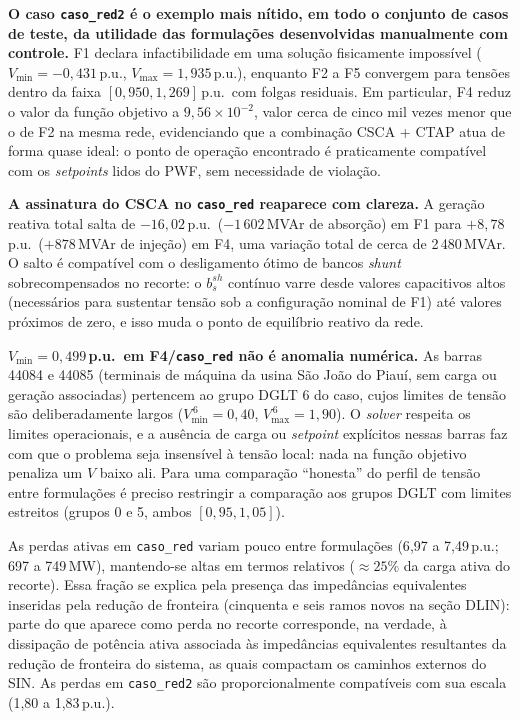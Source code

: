 \begin{alineascomnumero}
    \item \textbf{O caso \texttt{caso\_red2} é o exemplo mais nítido, em todo o conjunto de casos de teste, da utilidade das formulações desenvolvidas manualmente com controle.} F1 declara infactibilidade em uma solução fisicamente impossível ($V_{\min} = -0{,}431$\,p.u., $V_{\max} = 1{,}935$\,p.u.), enquanto F2 a F5 convergem para tensões dentro da faixa $[0{,}950, 1{,}269]$\,p.u.\ com folgas residuais. Em particular, F4 reduz o valor da função objetivo a $9{,}56 \times 10^{-2}$, valor cerca de cinco mil vezes menor que o de F2 na mesma rede, evidenciando que a combinação CSCA + CTAP atua de forma quase ideal: o ponto de operação encontrado é praticamente compatível com os \textit{setpoints} lidos do PWF, sem necessidade de violação.
    \item \textbf{A assinatura do CSCA no \texttt{caso\_red} reaparece com clareza.} A geração reativa total salta de $-16{,}02$\,p.u.\ ($-1\,602$\,MVAr de absorção) em F1 para $+8{,}78$\,p.u.\ ($+878$\,MVAr de injeção) em F4, uma variação total de cerca de 2\,480\,MVAr. O salto é compatível com o desligamento ótimo de bancos \textit{shunt} sobrecompensados no recorte: o $b^{sh}_s$ contínuo varre desde valores capacitivos altos (necessários para sustentar tensão sob a configuração nominal de F1) até valores próximos de zero, e isso muda o ponto de equilíbrio reativo da rede.
    \item \textbf{$V_{\min} = 0{,}499$\,p.u.\ em F4/\texttt{caso\_red} não é anomalia numérica.} As barras 44084 e 44085 (terminais de máquina da usina São João do Piauí, sem carga ou geração associadas) pertencem ao grupo DGLT 6 do caso, cujos limites de tensão são deliberadamente largos ($V_{\min}^{\,6} = 0{,}40$, $V_{\max}^{\,6} = 1{,}90$). O \textit{solver} respeita os limites operacionais, e a ausência de carga ou \textit{setpoint} explícitos nessas barras faz com que o problema seja insensível à tensão local: nada na função objetivo penaliza um $V$ baixo ali. Para uma comparação ``honesta'' do perfil de tensão entre formulações é preciso restringir a comparação aos grupos DGLT com limites estreitos (grupos 0 e 5, ambos $[0{,}95, 1{,}05]$).
\end{alineascomnumero}

As perdas ativas em \texttt{caso\_red} variam pouco entre formulações (6{,}97 a 7{,}49\,p.u.; 697 a 749\,MW), mantendo-se altas em termos relativos ($\approx 25\%$ da carga ativa do recorte). Essa fração se explica pela presença das impedâncias equivalentes inseridas pela redução de fronteira (cinquenta e seis ramos novos na seção DLIN): parte do que aparece como perda no recorte corresponde, na verdade, à dissipação de potência ativa associada às impedâncias equivalentes resultantes da redução de fronteira do sistema, as quais compactam os caminhos externos do SIN. As perdas em \texttt{caso\_red2} são proporcionalmente compatíveis com sua escala (1{,}80 a 1{,}83\,p.u.).

